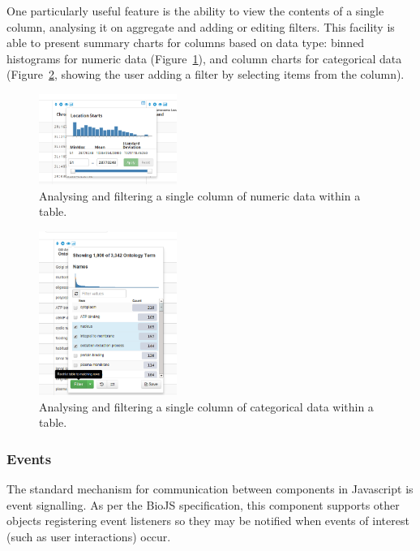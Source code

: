 \documentclass[10pt,a4paper,twocolumn]{article}
\begin{document}
One particularly useful feature is the ability to view the contents of a
single column, analysing it on aggregate and adding or editing filters. This
facility is able to present summary charts for columns based on data type:
binned histograms for numeric data (Figure~\ref{fig:column-summary}), and
column charts for categorical data (Figure~\ref{fig:cat-column-summary},
showing the user adding a filter by selecting items from the column).

\begin{figure}[t]
\centering
\includegraphics[width=0.4\textwidth]{im-tables-column-summary.png}
\caption{
    \label{fig:column-summary}
    Analysing and filtering a single column of numeric data within a table.
}
\end{figure}

\begin{figure}[t]
\centering
\includegraphics[width=0.4\textwidth]{category-column-summary.png}
\caption{
    \label{fig:cat-column-summary}
    Analysing and filtering a single column of categorical data within a table.
}
\end{figure}

\subsubsection*{Events}

The standard mechanism for communication between components in Javascript is
event signalling. As per the BioJS specification, this component supports other
objects registering event listeners so they may be notified when events of
interest (such as user interactions) occur.
\end{document}
